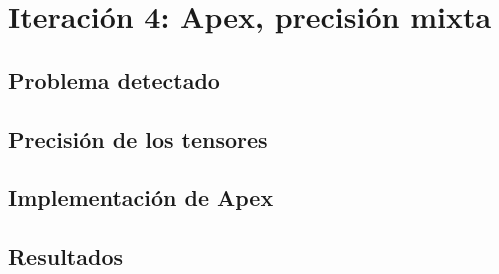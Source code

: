 \chapter{Iteración 4: Apex, precisión mixta}\label{apex}

\section{Problema detectado}\label{sec:apex_problem}

\section{Precisión de los tensores}\label{sec:apex_precision}

\section{Implementación de Apex}\label{sec:apex_implementation}

\section{Resultados}\label{sec:apex_resultados}
